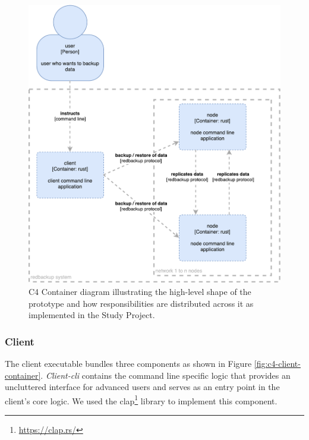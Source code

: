 \begin{figure}[h]
	\centering
	\includegraphics[width=1\linewidth]{resources/c4-sa-container}
	\caption[SA specific C4 Container diagram]{C4 Container diagram illustrating the high-level shape of the prototype and how responsibilities are distributed across it as implemented in the Study Project.}
	\label{fig:c4-sa-container}
\end{figure}

\subsubsection{Client}


The client executable bundles three components as shown in Figure \ref{fig:c4-client-container}. \emph{Client-cli} contains the command line specific logic that provides an uncluttered interface for advanced users and serves as an entry point in the client's core logic. We used the clap\footnote{\url{https://clap.rs/}}  library to implement this component.

